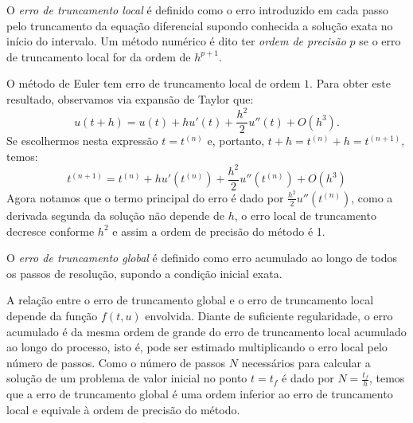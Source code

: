 \begin{defn} O \emph{erro de truncamento local} é definido como o erro introduzido em cada passo pelo truncamento da equação diferencial supondo conhecida a solução exata no início do intervalo. Um método numérico é dito ter \emph{ordem de precisão} $p$ se o erro de truncamento local for da ordem de $h^{p+1}$.
\end{defn}
\begin{ex} O método de Euler tem erro de truncamento local de ordem $1$. Para obter este resultado, observamos via expansão de Taylor que:
\begin{equation} u(t+h)=u(t)+hu'(t)+\frac{h^2}{2}u''(t)+O(h^3). \end{equation}
Se escolhermos nesta expressão $t=t^{(n)}$ e, portanto, $t+h=t^{(n)}+h=t^{(n+1)}$, temos:
\begin{equation} t^{(n+1)}=t^{(n)}+hu'(t^{(n)})+\frac{h^2}{2}u''(t^{(n)})+O(h^3) \end{equation}
Agora notamos que o termo principal do erro é dado por $\frac{h^2}{2}u''(t^{(n)})$, como a derivada segunda da solução não depende de $h$, o erro local de truncamento decresce conforme $h^2$ e assim a ordem de precisão do método é 1.
\end{ex}

\begin{defn} O \emph{erro de truncamento global} é definido como erro acumulado ao longo de todos os passos de resolução, supondo a condição inicial exata.
\end{defn}

A relação entre o erro de truncamento global e o erro de truncamento local depende da função $f(t,u)$ envolvida. Diante de suficiente regularidade, o erro acumulado é da mesma ordem de grande do erro de truncamento local acumulado ao longo do processo, isto é, pode ser estimado multiplicando o erro local pelo número de passos. Como o número de passos $N$ necessários para calcular a solução de um problema de valor inicial no ponto $t=t_{f}$ é dado por $N=\frac{t_f}{h}$, temos que a erro de truncamento global é uma ordem inferior ao erro de truncamento local e equivale à ordem de precisão do método.

